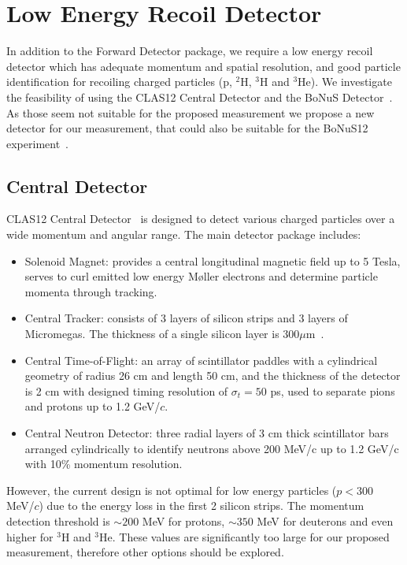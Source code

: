 \section{Low Energy Recoil Detector}
In addition to the Forward Detector package, we require a low energy recoil detector which has adequate momentum and spatial resolution, and good particle identification for recoiling charged particles (p, $^2$H, $^3$H and $^3$He). We investigate the feasibility of using the CLAS12 Central Detector and the BoNuS Detector~\cite{bonus6,bonus12}. As those seem not suitable for the proposed measurement we propose a new detector for our measurement, that could also be suitable for the BoNuS12 experiment~\cite{bonus12}.

\subsection{Central Detector}
CLAS12 Central Detector~\cite{CD} is designed to detect various charged particles over a wide momentum and angular range. The main detector package includes:
\begin{itemize}
\item Solenoid Magnet: provides a central longitudinal magnetic field up to 5 Tesla, serves to curl emitted low energy M{\o}ller electrons and determine particle momenta through tracking.
\item Central Tracker: consists of 3 layers of silicon strips and 3 layers of Micromegas. The thickness of a single silicon layer is $300\mu$m~\cite{SVT}.
\item Central Time-of-Flight: an array of scintillator paddles with a cylindrical geometry of radius 26 cm and length 50 cm, and the thickness of the detector is 2 cm with designed timing resolution of $\sigma_t = 50$ ps, used to separate pions and protons up to 1.2 GeV/$c$.
\item Central Neutron Detector:  three radial layers of 3 cm thick scintillator bars arranged cylindrically to identify neutrons above 200 MeV/c up to 1.2 GeV/c with 10\% momentum resolution.
\end{itemize}

However, the current design is not optimal for low energy particles ($p<300$ MeV/$c$) due to the energy loss in the first 2 silicon strips. The momentum detection threshold is $\sim 200$ MeV for protons, $\sim 350$ MeV for deuterons and even higher for $^3$H and $^3$He. These values are significantly too large for our proposed measurement, therefore other options should be explored.

